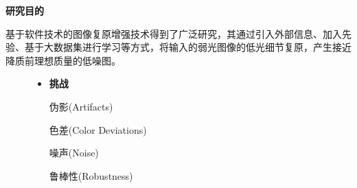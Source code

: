 \documentclass[CJK,aspectratio=169]{beamer}  %
\begin{document}
	\begin{frame}
		{ \yahei \textbf{研究目的}}
		
		\vspace{0.1cm}
		
		{ \yahei 基于软件技术的图像复原增强技术得到了广泛研究，其通过引入外部信息、加入先验、基于大数据集进行学习等方式，将输入的弱光图像的低光细节复原，产生接近降质前理想质量的低噪图。}
		
		\begin{figure}
			\centering			
			\begin{minipage}{.4\columnwidth}
				\begin{itemize} 
					\item {} \yahei \textbf{挑战}
					
					 \yahei 伪影(Artifacts)
					
					 \yahei 色差(Color Deviations) 
					
					 \yahei 噪声(Noise)
					
					 \yahei 鲁棒性(Robustness)
					

\end{itemize}
\end{minipage}
\end{figure}
\end{frame}
\end{document}
